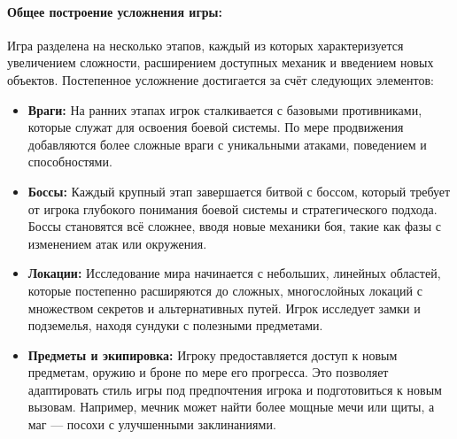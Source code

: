 \documentclass{article}
\begin{document}
\begin{itemize}
\paragraph{Общее построение усложнения игры:}
Игра разделена на несколько этапов, каждый из которых характеризуется увеличением сложности, расширением доступных механик и введением новых объектов. Постепенное усложнение достигается за счёт следующих элементов:
\begin{itemize}
    \item \textbf{Враги:} На ранних этапах игрок сталкивается с базовыми противниками, которые служат для освоения боевой системы. По мере продвижения добавляются более сложные враги с уникальными атаками, поведением и способностями.
    \item \textbf{Боссы:} Каждый крупный этап завершается битвой с боссом, который требует от игрока глубокого понимания боевой системы и стратегического подхода. Боссы становятся всё сложнее, вводя новые механики боя, такие как фазы с изменением атак или окружения.
    \item \textbf{Локации:} Исследование мира начинается с небольших, линейных областей, которые постепенно расширяются до сложных, многослойных локаций с множеством секретов и альтернативных путей. Игрок исследует замки и подземелья, находя сундуки с полезными предметами.
    \item \textbf{Предметы и экипировка:} Игроку предоставляется доступ к новым предметам, оружию и броне по мере его прогресса. Это позволяет адаптировать стиль игры под предпочтения игрока и подготовиться к новым вызовам. Например, мечник может найти более мощные мечи или щиты, а маг — посохи с улучшенными заклинаниями.
\end{itemize}


\end{itemize}
\end{document}
